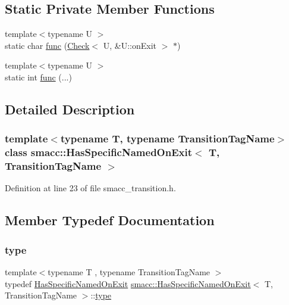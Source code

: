 \subsection*{Static Private Member Functions}
\begin{DoxyCompactItemize}
\item 
{\footnotesize template$<$typename U $>$ }\\static char \hyperlink{classsmacc_1_1HasSpecificNamedOnExit_aeaaa52aa3aeb9d4c912aa953e020ab50}{func} (\hyperlink{structsmacc_1_1HasSpecificNamedOnExit_1_1Check}{Check}$<$ U, \&U\+::on\+Exit $>$ $\ast$)
\item 
{\footnotesize template$<$typename U $>$ }\\static int \hyperlink{classsmacc_1_1HasSpecificNamedOnExit_a5df0edab149c42bfd6e5a7221150095a}{func} (...)
\end{DoxyCompactItemize}


\subsection{Detailed Description}
\subsubsection*{template$<$typename T, typename Transition\+Tag\+Name$>$\newline
class smacc\+::\+Has\+Specific\+Named\+On\+Exit$<$ T, Transition\+Tag\+Name $>$}



Definition at line 23 of file smacc\+\_\+transition.\+h.



\subsection{Member Typedef Documentation}
\mbox{\label{classsmacc_1_1HasSpecificNamedOnExit_a79c051b3a86d6a6c05d4c3420d7147ff}} 
\subsubsection{\texorpdfstring{type}{type}}
{\footnotesize\ttfamily template$<$typename T , typename Transition\+Tag\+Name $>$ \\
typedef \hyperlink{classsmacc_1_1HasSpecificNamedOnExit}{Has\+Specific\+Named\+On\+Exit} \hyperlink{classsmacc_1_1HasSpecificNamedOnExit}{smacc\+::\+Has\+Specific\+Named\+On\+Exit}$<$ T, Transition\+Tag\+Name $>$\+::\hyperlink{classsmacc_1_1HasSpecificNamedOnExit_a79c051b3a86d6a6c05d4c3420d7147ff}{type}}



